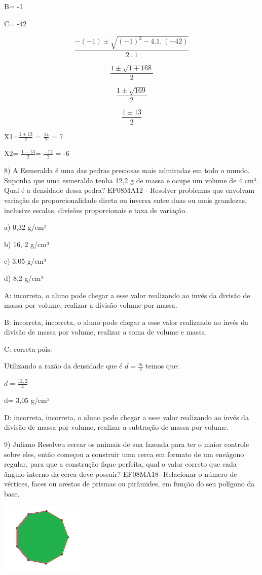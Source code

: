 B= -1

C= -42

\[\frac{- ( - 1) \pm \sqrt{{( - 1)}^{2} - 4.1.\ ( - 42)}}{2\ .\ 1}\]

\[\frac{1 \pm \sqrt{1 + 168}}{2}\]

\[\frac{1 \pm \sqrt{169}}{2}\]

\[\frac{1 \pm 13}{2}\]

X1=\(\frac{1 + 13}{2}\) = \(\frac{14}{2}\) = 7

X2= \(\frac{1 - 13}{2}\)= \(\frac{- 12}{2}\) = -6

8) A Esmeralda é uma das pedras preciosas mais admiradas em todo o
mundo. Suponha que uma esmeralda tenha 12,2 g de massa e ocupe um volume
de 4 cm³. Qual é a densidade dessa pedra? EF08MA12 - Resolver problemas
que envolvam variação de proporcionalidade direta ou inversa entre duas
ou mais grandezas, inclusive escalas, divisões proporcionais e taxa de
variação.

a) 0,32 g/cm³

b) 16, 2 g/cm³

c) 3,05 g/cm³

d) 8,2 g/cm³

A: incorreta, o aluno pode chegar a esse valor realizando ao invés da
divisão de massa por volume, realizar a divisão volume por massa.

B: incorreta, incorreta, o aluno pode chegar a esse valor realizando ao
invés da divisão de massa por volume, realizar a soma de volume e massa.

C: correta pois:

Utilizando a razão da densidade que é \(d = \frac{m}{v}\) temos que:

\(d = \frac{12,2}{4}\)

d= 3,05 g/cm³

D: incorreta, incorreta, o aluno pode chegar a esse valor realizando ao
invés da divisão de massa por volume, realizar a subtração de massa por
volume.

9) Juliano Resolveu cercar os animais de sua fazenda para ter o maior
controle sobre eles, então começou a construir uma cerca em formato de
um eneágono regular, para que a construção fique perfeita, qual o valor
correto que cada ângulo interno da cerca deve possuir? EF08MA18-
Relacionar o número de vértices, faces ou arestas de prismas ou
pirâmides, em função do seu polígono da base.

\includegraphics[width=1.575in,height=1.33385in]{./imgSAEB_8_MAT/media/image60.png}

